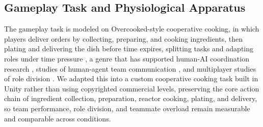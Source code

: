 \documentclass[manuscript,review,anonymous]{acmart}
\begin{document}
\subsection{Gameplay Task and Physiological Apparatus}
The gameplay task is modeled on Overcooked-style cooperative cooking, in which players deliver orders by collecting, preparing, and cooking ingredients, then plating and delivering the dish before time expires, splitting tasks and adapting roles under time pressure \cite{carroll_utility_2019, humancompatibleai_overcookedai}, a genre that has supported human-AI coordination research \cite{bishop_chaopt_2020}, studies of human-agent team communication \cite{rosero_two_2021}, and multiplayer studies of role division \cite{baek_toward_2022}. We adapted this into a custom cooperative cooking task built in Unity rather than using copyrighted commercial levels, preserving the core action chain of ingredient collection, preparation, reactor cooking, plating, and delivery, so team performance, role division, and teammate overload remain measurable and comparable across conditions.
\end{document}
